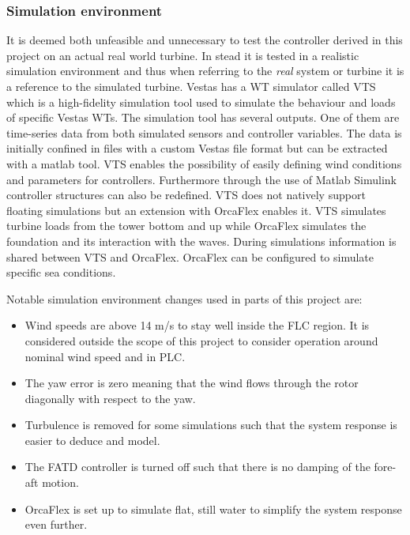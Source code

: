 \subsubsection{Simulation environment}
It is deemed both unfeasible and unnecessary to test the controller derived in this project on an actual real world turbine. In stead it is tested in a realistic simulation environment and thus when referring to the \textit{real} system or turbine it is a reference to the simulated turbine. Vestas has a WT simulator called VTS which is a high-fidelity simulation tool used to simulate the behaviour and loads of specific Vestas WTs. The simulation tool has several outputs. One of them are time-series data from both simulated sensors and controller variables. The data is initially confined in files with a custom Vestas file format but can be extracted with a matlab tool. VTS enables the possibility of easily defining wind conditions and parameters for controllers. Furthermore through the use of Matlab Simulink controller structures can also be redefined. VTS does not natively support floating simulations but an extension with OrcaFlex enables it. VTS simulates turbine loads from the tower bottom and up while OrcaFlex simulates the foundation and its interaction with the waves. During simulations information is shared between VTS and OrcaFlex. OrcaFlex can be configured to simulate specific sea conditions.

Notable simulation environment changes used in parts of this project are:
\begin{itemize}
	\item Wind speeds are above 14 m/s to stay well inside the FLC region. It is considered outside the scope of this project to consider operation around nominal wind speed and in PLC.
	\item The yaw error is zero meaning that the wind flows through the rotor diagonally with respect to the yaw.
	\item Turbulence is removed for some simulations such that the system response is easier to deduce and model. 
	\item The FATD controller is turned off such that there is no damping of the fore-aft motion.
	\item OrcaFlex is set up to simulate flat, still water to simplify the system response even further. 
\end{itemize}


